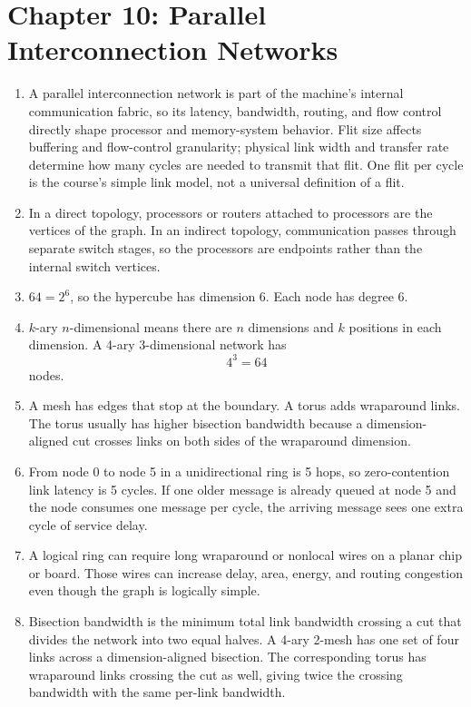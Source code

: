 \documentclass[11pt]{article}
\begin{document}
\section{Chapter 10: Parallel Interconnection Networks}
\begin{enumerate}
    \item A parallel interconnection network is part of the machine's internal communication fabric, so its latency, bandwidth, routing, and flow control directly shape processor and memory-system behavior.
    Flit size affects buffering and flow-control granularity; physical link width and transfer rate determine how many cycles are needed to transmit that flit.
    One flit per cycle is the course's simple link model, not a universal definition of a flit.

    \item In a direct topology, processors or routers attached to processors are the vertices of the graph.
    In an indirect topology, communication passes through separate switch stages, so the processors are endpoints rather than the internal switch vertices.

    \item \(64=2^6\), so the hypercube has dimension 6.
    Each node has degree 6.

    \item \(k\)-ary \(n\)-dimensional means there are \(n\) dimensions and \(k\) positions in each dimension.
    A 4-ary 3-dimensional network has
    \[
        4^3=64
    \]
    nodes.

    \item A mesh has edges that stop at the boundary.
    A torus adds wraparound links.
    The torus usually has higher bisection bandwidth because a dimension-aligned cut crosses links on both sides of the wraparound dimension.

    \item From node 0 to node 5 in a unidirectional ring is 5 hops, so zero-contention link latency is 5 cycles.
    If one older message is already queued at node 5 and the node consumes one message per cycle, the arriving message sees one extra cycle of service delay.

    \item A logical ring can require long wraparound or nonlocal wires on a planar chip or board.
    Those wires can increase delay, area, energy, and routing congestion even though the graph is logically simple.

    \item Bisection bandwidth is the minimum total link bandwidth crossing a cut that divides the network into two equal halves.
    A 4-ary 2-mesh has one set of four links across a dimension-aligned bisection.
    The corresponding torus has wraparound links crossing the cut as well, giving twice the crossing bandwidth with the same per-link bandwidth.


\end{enumerate}
\end{document}
